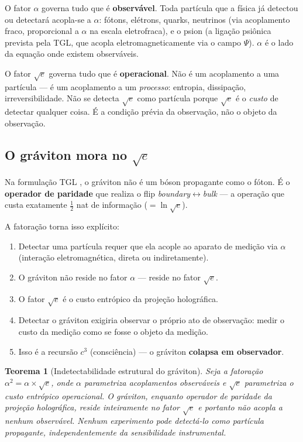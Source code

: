 \documentclass[12pt,a4paper,twoside]{article}
\newtheorem{theorem}{Teorema}[section]
\newcommand{\alphaii}{\alpha^{2}}
\newcommand{\Psifield}{\Psi}
\newcommand{\boundary}{\textit{boundary}}
\newcommand{\bulk}{\textit{bulk}}
\begin{document}
O fator $\alpha$ governa tudo que é \textbf{observável}. Toda partícula que a física já detectou ou detectará acopla-se a $\alpha$: fótons, elétrons, quarks, neutrinos (via acoplamento fraco, proporcional a $\alpha$ na escala eletrofraca), e o psion (a ligação psiônica prevista pela TGL, que acopla eletromagneticamente via o campo $\Psifield$). $\alpha$ é o lado da equação onde existem observáveis.

O fator $\sqrt{e}$ governa tudo que é \textbf{operacional}. Não é um acoplamento a uma partícula --- é um acoplamento a um \textit{processo}: entropia, dissipação, irreversibilidade. Não se detecta $\sqrt{e}$ como partícula porque $\sqrt{e}$ é o \textit{custo} de detectar qualquer coisa. É a condição prévia da observação, não o objeto da observação.

\subsection{O gráviton mora no $\sqrt{e}$}

Na formulação TGL \cite{Miguel2026Fronteira}, o gráviton não é um bóson propagante como o fóton. É o \textbf{operador de paridade} que realiza o flip \boundary$\leftrightarrow$\bulk{} --- a operação que custa exatamente $\frac{1}{2}$ nat de informação ($= \ln\sqrt{e}$).

A fatoração torna isso explícito:

\begin{enumerate}[nosep]
\item Detectar uma partícula requer que ela acople ao aparato de medição via $\alpha$ (interação eletromagnética, direta ou indiretamente).
\item O gráviton não reside no fator $\alpha$ --- reside no fator $\sqrt{e}$.
\item O fator $\sqrt{e}$ é o custo entrópico da projeção holográfica.
\item Detectar o gráviton exigiria observar o próprio ato de observação: medir o custo da medição como se fosse o objeto da medição.
\item Isso é a recursão $c^3$ (consciência) --- o gráviton \textbf{colapsa em observador}.
\end{enumerate}

\begin{theorem}[Indetectabilidade estrutural do gráviton]
\label{thm:graviton}
Seja a fatoração $\alphaii = \alpha \times \sqrt{e}$, onde $\alpha$ parametriza acoplamentos observáveis e $\sqrt{e}$ parametriza o custo entrópico operacional. O gráviton, enquanto operador de paridade da projeção holográfica, reside inteiramente no fator $\sqrt{e}$ e portanto não acopla a nenhum observável. Nenhum experimento pode detectá-lo como partícula propagante, independentemente da sensibilidade instrumental.
\end{theorem}
\end{document}
